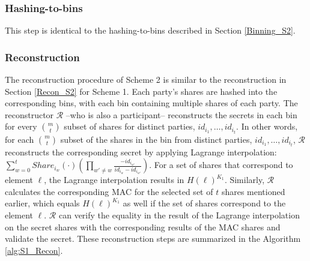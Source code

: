 \subsubsection{Hashing-to-bins}\label{Binning_S1} This step is identical to the hashing-to-bins described in Section \ref{Binning_S2}.

\subsubsection{Reconstruction}\label{Recon_S1}
The reconstruction procedure of Scheme 2 is similar to the reconstruction in Section \ref{Recon_S2} for Scheme 1. Each party's shares are hashed into the corresponding bins, with each bin containing multiple shares of each party. The reconstructor $\mathcal{R}$ --who is also a participant-- reconstructs the secrets in each bin for every $m \choose t$ subset of shares for distinct parties, $id_{i_1}, \dots, id_{i_t}$. In other words, for each $m \choose t$ subset of the shares in the bin from distinct parties, $id_{i_1}, \dots, id_{i_t}$, $\mathcal{R}$ reconstructs the corresponding secret by applying Lagrange interpolation: $\sum^t_{w=0} Share_{i_w}(\cdot)(\prod_{w' \neq w} \frac{-id_{i_{w'}}}{id_{i_w} - id_{i_{w'}}})$. For a set of shares that correspond to element $\ell$, the Lagrange interpolation results in $H(\ell)^{K_1}$. Similarly, $\mathcal{R}$ calculates the corresponding MAC for the selected set of $t$ shares mentioned earlier, which equals $H(\ell)^{K_1}$ as well if the set of shares correspond to the element $\ell$. $\mathcal{R}$ can verify the equality in the result of the Lagrange interpolation on the secret shares with the corresponding results of the MAC shares and validate the secret. These reconstruction steps are summarized in the Algorithm \ref{alg:S1_Recon}.

